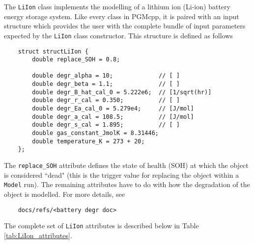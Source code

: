 \documentclass[12pt, letterpaper]{report}
\begin{document}
The \texttt{LiIon} class implements the modelling of a lithium ion (Li-ion) battery energy storage system. Like every class in PGMcpp, it is paired with an input structure which provides the user with the complete bundle of input parameters expected by the \texttt{LiIon} class constructor. This structure is defined as follows

\begin{verbatim}
    struct structLiIon {
        double replace_SOH = 0.8;
        
        double degr_alpha = 10;             // [ ]
        double degr_beta = 1.1;             // [ ]
        double degr_B_hat_cal_0 = 5.222e6;  // [1/sqrt(hr)]
        double degr_r_cal = 0.350;          // [ ]
        double degr_Ea_cal_0 = 5.279e4;     // [J/mol]
        double degr_a_cal = 108.5;          // [J/mol]
        double degr_s_cal = 1.895;          // [ ]
        double gas_constant_JmolK = 8.31446;
        double temperature_K = 273 + 20;    
    };
\end{verbatim}

\noindent The \texttt{replace\_SOH} attribute defines the state of health (SOH) at which the object is considered ``dead" (this is the trigger value for replacing the object within a \texttt{Model} run). The remaining attributes have to do with how the degradation of the object is modelled. For more details, see

\begin{verbatim}
    docs/refs/<battery degr doc>
\end{verbatim}

The complete set of \texttt{LiIon} attributes is described below in Table \ref{tab:LiIon_attributes}.

\begin{table}[H]
    \centering
    \caption{\texttt{LiIon} attribute descriptions}
    \label{tab:LiIon_attributes}
\end{table}
\end{document}
